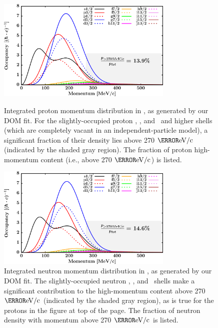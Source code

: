 \begin{figure}[tb]
    \centering
    \includegraphics[width=0.75\textwidth]{figures/ca40_protonLJMomentumDistIntegral.png}
    \caption[Proton momentum distribution in \caForty]
    {
        Integrated proton momentum distribution in \caForty, as generated
        by our DOM fit. For the slightly-occupied proton \fSeven, \fFive, and
        \gNine\ and higher shells (which are completely vacant in an
        independent-particle model), a significant fraction of their
        density lies above 270 $\mega\electronvolt/\text{c}$ (indicated by
        the shaded gray region). The fraction of
        proton high-momentum content (i.e., above 270
        $\mega\electronvolt/\text{c}$) is listed.
    }
    \label{Ca40ProtonMomentumDistInt}
    \vspace{16pt}
    \centering
    \includegraphics[width=0.75\textwidth]{figures/ca40_neutronLJMomentumDistIntegral.png}
    \caption[Neutron momentum distributions in \caForty]
    {
        Integrated neutron momentum distribution in \caForty, as generated
        by our DOM fit. The slightly-occupied neutron \fSeven, \fFive, and
        \gNine\ shells make a significant contribution to the high-momentum
        content above 270 $\mega\electronvolt/\text{c}$ (indicated by the
        shaded gray region), as is true for the protons in the figure at top
        of the page. The fraction of neutron density with
        momentum above 270 $\mega\electronvolt/\text{c}$ is listed.
    }
    \label{Ca40NeutronMomentumDistInt}
\end{figure}


